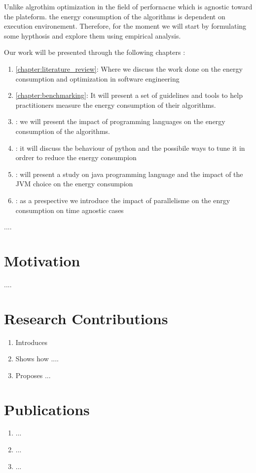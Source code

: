 Unlike algrothim optimization in the field of perfornacne which is agnostic toward the plateform. the energy consumption of the algorithms is dependent on execution environement.
Therefore, for the moment we will start by formulating some hypthosis and explore them using empirical analysis.

Our work will be presented through the following chapters :

\begin{enumerate}
    \item \ref{chapter:literature_review}: Where we discuss the work done on the energy consumption and optimization in software engineering
    \item \ref{chapter:benchmarking}: It will present a set of guidelines and tools to help practitioners measure the energy consumption of their algorithms.
    \item : we will present the impact of programming languages on the energy consumption of the algorithms.
    \item : it will discuss the behaviour of python and the possibile ways to tune it in ordrer to reduce the energy consumpion
    \item : will present a study on java programming language and the impact of the JVM choice on the energy consumpion
    \item : as a prespective we introduce the impact of parallelisme on the enrgy consumption on time agnostic cases
\end{enumerate}




....


\section{Motivation}
....


\section{Research Contributions}


\begin{enumerate}

    \item Introduces
    \item Shows how ....
    \item Proposes ...

\end{enumerate}



\section{Publications}

\begin{enumerate}
    \item ...

    \item ...

    \item ...

\end{enumerate}
\cleardoublepage
